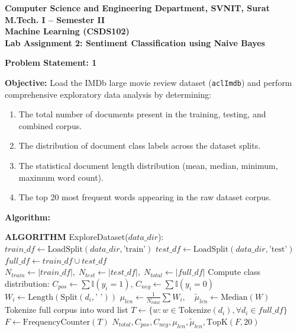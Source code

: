 \documentclass[12pt]{article}
\begin{document}

\begin{center}
\textbf{Computer Science and Engineering Department, SVNIT, Surat}\\
\textbf{M.Tech. I -- Semester II}\\
\textbf{Machine Learning (CSDS102)}\\
\textbf{Lab Assignment 2: Sentiment Classification using Naive Bayes}
\end{center}

\vspace{0.3cm}


\textbf{Problem Statement: 1}

\textbf{Objective:} Load the IMDb large movie review dataset (\texttt{aclImdb}) and perform comprehensive exploratory data analysis by determining:
\begin{enumerate}
    \item The total number of documents present in the training, testing, and combined corpus.
    \item The distribution of document class labels across the dataset splits.
    \item The statistical document length distribution (mean, median, minimum, maximum word count).
    \item The top 20 most frequent words appearing in the raw dataset corpus.
\end{enumerate}

\vspace{0.2cm}
\textbf{Algorithm:}

\begin{algorithm}[H]
\caption{Dataset Exploration and Corpus Statistics}
\begin{algorithmic}[1]
\State \textbf{ALGORITHM} ExploreDataset($data\_dir$):
    \State $train\_df \gets \text{LoadSplit}(data\_dir, \text{'train'})$
    \State $test\_df \gets \text{LoadSplit}(data\_dir, \text{'test'})$
    \State $full\_df \gets train\_df \cup test\_df$
    \State $N_{train} \gets |train\_df|,\; N_{test} \gets |test\_df|,\; N_{total} \gets |full\_df|$
    \State Compute class distribution: $C_{pos} \gets \sum \mathbb{I}(y_i = 1)$, $C_{neg} \gets \sum \mathbb{I}(y_i = 0)$
        \State $W_i \gets \text{Length}(\text{Split}(d_i, \text{' '}))$
    \EndFor
    \State $\mu_{len} \gets \frac{1}{N_{total}}\sum W_i,\quad \tilde{\mu}_{len} \gets \text{Median}(W)$
    \State Tokenize full corpus into word list $T \gets \{w : w \in \text{Tokenize}(d_i), \forall d_i \in full\_df\}$
    \State $F \gets \text{FrequencyCounter}(T)$
    \State \Return $N_{total}, C_{pos}, C_{neg}, \mu_{len}, \tilde{\mu}_{len}, \text{TopK}(F, 20)$
\end{algorithmic}
\end{algorithm}
\end{document}
